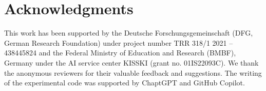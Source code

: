 \section*{Acknowledgments}

This work has been supported by the Deutsche Forschungsgemeinschaft (DFG, German Research
Foundation) under project number TRR 318/1 2021 – 438445824 and the Federal Ministry of Education and Research (BMBF), Germany under the AI service center KISSKI (grant no. 01IS22093C). We thank the anonymous reviewers for their valuable feedback and suggestions. The writing of the experimental code was supported by ChaptGPT and GitHub Copilot.
